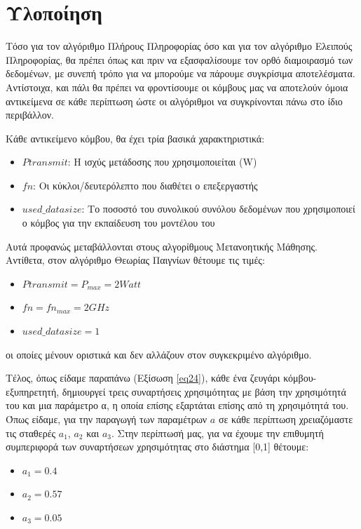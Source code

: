 \section{Υλοποίηση}

Τόσο για τον αλγόριθμο Πλήρους Πληροφορίας όσο και για τον αλγόριθμο Ελειπούς Πληροφορίας, θα πρέπει όπως και πριν να εξασφαλίσουμε τον ορθό διαμοιρασμό των δεδομένων, με συνεπή τρόπο για να μπορούμε να πάρουμε συγκρίσιμα αποτελέσματα. Αντίστοιχα, και πάλι θα πρέπει να φροντίσουμε οι κόμβους μας να αποτελούν όμοια αντικείμενα σε κάθε περίπτωση ώστε οι αλγόριθμοι να συγκρίνονται πάνω στο ίδιο περιβάλλον.

Κάθε αντικείμενο κόμβου, θα έχει τρία βασικά χαρακτηριστικά:
\begin{itemize}
    \item $Ptransmit$: Η ισχύς μετάδοσης που χρησιμοποιείται (W)
    \item $fn$: Οι κύκλοι/δευτερόλεπτο που διαθέτει ο επεξεργαστής
    \item $used\_datasize$: Το ποσοστό του συνολικού συνόλου δεδομένων που χρησιμοποιεί ο κόμβος για την εκπαίδευση του μοντέλου του   
\end{itemize}

Αυτά προφανώς μεταβάλλονται στους αλγορίθμους Μετανοητικής Μάθησης. Αντίθετα, στον αλγόριθμο Θεωρίας Παιγνίων θέτουμε τις τιμές:
\begin{itemize}
    \item $Ptransmit = P_{max} = 2 Watt$
    \item $fn = fn_{max} = 2 GHz$
    \item $used\_datasize = 1$   
\end{itemize}
οι οποίες μένουν οριστικά και δεν αλλάζουν στον συγκεκριμένο αλγόριθμο.

Τέλος, όπως είδαμε παραπάνω (Εξίσωση \ref{eq24}), κάθε ένα ζευγάρι κόμβου-εξυπηρετητή, δημιουργεί τρεις συναρτήσεις χρησιμότητας με βάση την χρησιμότητά του και μια παράμετρο α, η οποία επίσης εξαρτάται επίσης από τη χρησιμότητά του. Όπως είδαμε, για την παραγωγή των παραμέτρων $a$ σε κάθε περίπτωση χρειαζόμαστε τις σταθερές $a_1$, $a_2$ και $a_3$. Στην περίπτωσή μας, για να έχουμε την επιθυμητή συμπεριφορά των συναρτήσεων χρησιμότητας στο διάστημα [0,1] θέτουμε:

\begin{itemize}
    \item $a_1 = 0.4$
    \item $a_2 = 0.57$
    \item $a_3 = 0.05$
\end{itemize}

